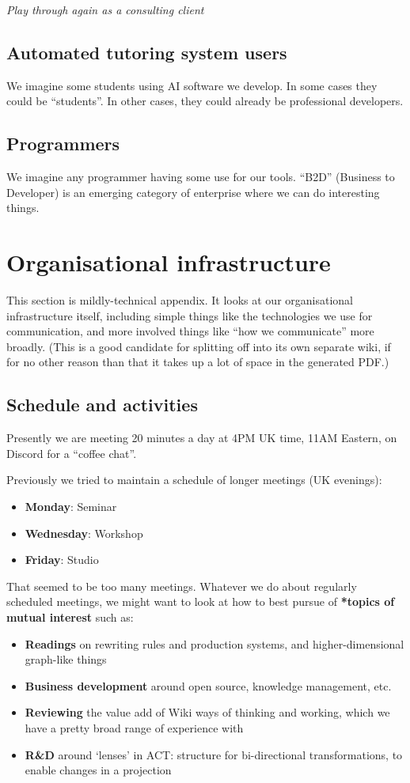 \documentclass[11pt]{article}
\begin{document}
\emph{Play through again as a consulting client}
\subsection{Automated tutoring system users}
\label{sec:org0ca358e}
We imagine some students using AI software we develop.  In some cases
they could be “students”.  In other cases, they could already be
professional developers.
\subsection{Programmers}
\label{sec:orgdbe9fe7}
We imagine any programmer having some use for our tools.  “B2D”
(Business to Developer) is an emerging category of enterprise where we
can do interesting things.
\section{Organisational infrastructure}
\label{sec:orge4802fc}
This section is mildly-technical appendix.  It looks at our
organisational infrastructure itself, including simple things like the
technologies we use for communication, and more involved things like
“how we communicate” more broadly.  (This is a good candidate for
splitting off into its own separate wiki, if for no other reason than
that it takes up a lot of space in the generated PDF.)

\subsection{Schedule and activities}
\label{sec:org27dfd6d}

Presently we are meeting 20 minutes a day at 4PM UK time, 11AM
Eastern, on Discord for a “coffee chat”.

Previously we tried to maintain a schedule of longer meetings (UK
evenings):

\begin{itemize}
\item \textbf{Monday}: Seminar
\item \textbf{Wednesday}: Workshop
\item \textbf{Friday}: Studio
\end{itemize}

That seemed to be too many meetings.  Whatever we do about regularly
scheduled meetings, we might want to look at how to best pursue of
\textbf{*topics of mutual interest} such as:

\begin{itemize}
\item \textbf{Readings} on rewriting rules and production systems, and higher-dimensional graph-like things
\item \textbf{Business development} around open source, knowledge management, etc.
\item \textbf{Reviewing} the value add of Wiki ways of thinking and working, which we have a pretty broad range of experience with
\item \textbf{R\&D} around ‘lenses’ in ACT: structure for bi-directional transformations, to enable changes in a projection
\end{itemize}
\end{document}
